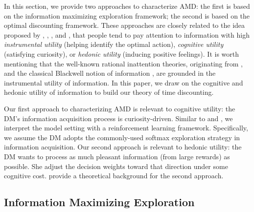 \documentclass[
  12pt,
]{article}
\begin{document}
In this section, we provide two approaches to characterize AMD: the
first is based on the information maximizing exploration framework; the
second is based on the optimal discounting framework. These approaches
are closely related to the idea proposed by
\citet{gottlieb2012attention}, \citet{gottlieb2013information},
\citet{sharot2020people}, and \citet{golman2022demand}, that people tend
to pay attention to information with high \emph{instrumental utility}
(helping identify the optimal action), \emph{cognitive utility}
(satisfying curiosity), or \emph{hedonic utility} (inducing positive
feelings). It is worth mentioning that the well-known rational
inattention theories, originating from \citet{sims2003implications}, and
the classical Blackwell notion of information
\citep{blackwell1951comparison}, are grounded in the instrumental
utility of information. In this paper, we draw on the cognitive and
hedonic utility of information to build our theory of time discounting.

Our first approach to characterizing AMD is relevant to cognitive
utility: the DM's information acquisition process is curiosity-driven.
Similar to \citet{gottlieb2012attention} and
\citet{gottlieb2013information}, we interpret the model setting with a
reinforcement learning framework. Specifically, we assume the DM adopts
the commonly-used softmax exploration strategy in information
acquisition. Our second approach is relevant to hedonic utility: the DM
wants to process as much pleasant information (from large rewards) as
possible. She adjust the decision weights toward that direction under
some cognitive cost. \citet{noor2022optimal,noor2024constrained} provide
a theoretical background for the second approach.

\hypertarget{information-maximizing-exploration}{%
\subsection{\texorpdfstring{Information Maximizing Exploration
\label{info_max_explor}}{Information Maximizing Exploration }}\label{information-maximizing-exploration}}
\end{document}
